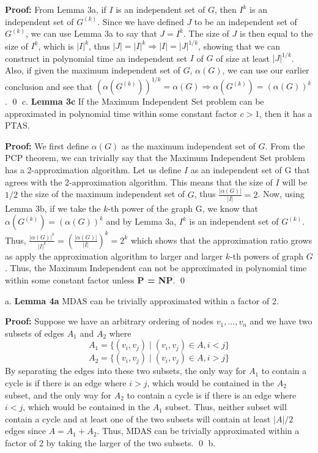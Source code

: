 \documentclass[oneside]{homework} %
\begin{document}
\textbf{Proof:} From Lemma 3a, if $I$ is an independent set of $G$, then $I^k$ is an independent set of $G^{(k)}$. Since we have defined $J$ to be an independent set of $G^{(k)}$, we can use Lemma 3a to say that $J = I^k$. The size of $J$ is then equal to the size of $I^k$, which is $|I|^k$, thus $|J| = |I|^k \Longrightarrow |I| = |J|^{1/k}$, showing that we can construct in polynomial time an independent set $I$ of $G$ of size at least $|J|^{1/k}$. Also, if given the maximum independent set of $G$, $\alpha(G)$, we can use our earlier conclusion and see that $(\alpha(G^{(k)}))^{1/k} = \alpha(G) \Longrightarrow \alpha(G^{(k)}) = (\alpha(G))^k$. \hfill\qed
\newline
\newline
{\large c.} \textbf{Lemma 3c} If the Maximum Independent Set problem can be approximated in polynomial time within some constant factor $c > 1$, then it has a PTAS.
\newline

\textbf{Proof:} We first define $\alpha(G)$ as the maximum independent set of $G$. From the PCP theorem, we can trivially say that the Maximum Independent Set problem has a 2-approximation algorithm. Let us define $I$ as an independent set of G that agrees with the 2-approximation algorithm. This means that the size of $I$ will be $1/2$ the size of the maximum independent set of $G$, thus $\frac{|\alpha(G)|}{|I|} = 2$. Now, using Lemma 3b, if we take the $k$-th power of the graph G, we know that $\alpha(G^{(k)}) = (\alpha(G))^k$ and by Lemma 3a, $I^k$ is an independent set of $G^{(k)}$. Thus, $\frac{|\alpha(G)|^k}{|I|^k} = (\frac{|\alpha(G)|}{|I|})^k = 2^k$ which shows that the approximation ratio grows as apply the approximation algorithm to larger and larger $k$-th powers of graph $G$. Thus, the Maximum Independent can not be approximated in polynomial time within some constant factor unless \textbf{P = NP}. \hfill\qed

{\large a.} \textbf{Lemma 4a} MDAS can be trivially approximated within a factor of 2.
\newline

\textbf{Proof:} Suppose we have an arbitrary ordering of nodes $v_1, ..., v_n$ and we have two subsets of edges $A_1$ and $A_2$ where $$A_1 = \{(v_i, v_j) \mid (v_i, v_j) \in A, i < j\}$$ $$A_2 = \{(v_i, v_j) \mid (v_i, v_j) \in A, i > j\}$$ By separating the edges into these two subsets, the only way for $A_1$ to contain a cycle is if there is an edge where $i > j$, which would be contained in the $A_2$ subset, and the only way for $A_2$ to contain a cycle is if there is an edge where $ i < j$, which would be contained in the $A_1$ subset. Thus, neither subset will contain a cycle and at least one of the two subsets will contain at least $|A|/2$ edges since $A = A_1 + A_2$. Thus, MDAS can be trivially approximated within a factor of 2 by taking the larger of the two subsets. \hfill\qed
\newline
\newline
{\large b.}
\end{document}
